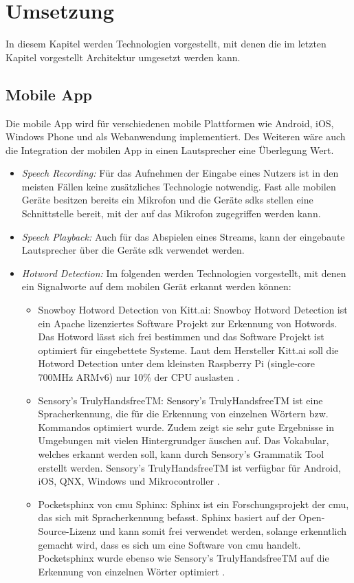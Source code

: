 \section{Umsetzung}
In diesem Kapitel werden Technologien vorgestellt, mit denen die im letzten Kapitel vorgestellt Architektur umgesetzt werden kann. 

\subsection{Mobile App}
Die mobile App wird für verschiedenen mobile Plattformen wie Android, iOS, Windows Phone und als Webanwendung implementiert. Des Weiteren wäre auch die Integration der mobilen App in einen Lautsprecher eine Überlegung Wert. 
\begin{itemize}
	\item \textsl{Speech Recording:} Für das Aufnehmen der Eingabe eines Nutzers ist in den meisten Fällen keine zusätzliches Technologie notwendig. Fast alle mobilen Geräte besitzen bereits ein Mikrofon und die Geräte \ac{sdk}s stellen eine Schnittstelle bereit, mit der auf das Mikrofon zugegriffen werden kann.
	\item \textsl{Speech Playback:} Auch für das Abspielen eines Streams, kann der eingebaute Lautsprecher über die Geräte \ac{sdk} verwendet werden.
	\item \textsl{Hotword Detection:} Im folgenden werden Technologien vorgestellt, mit denen ein Signalworte auf dem mobilen Gerät erkannt werden können: 
	\begin{itemize}
		\item Snowboy Hotword Detection von Kitt.ai: Snowboy Hotword Detection ist ein Apache lizenziertes Software Projekt zur Erkennung von Hotwords. Das Hotword lässt sich frei bestimmen und das Software Projekt ist optimiert für eingebettete Systeme. Laut dem Hersteller Kitt.ai soll die Hotword Detection unter dem kleinsten Raspberry Pi (single-core 700MHz ARMv6) nur 10\% der CPU
		auslasten \cite{SnowboyHotwordDetection}.
		\item Sensory's TrulyHandsfreeTM: Sensory's TrulyHandsfreeTM ist eine Spracherkennung, die für die Erkennung von einzelnen Wörtern bzw. Kommandos optimiert wurde. Zudem zeigt sie sehr gute Ergebnisse in Umgebungen mit vielen Hintergrundger	äuschen auf. Das Vokabular, welches erkannt werden soll, kann durch Sensory's Grammatik Tool erstellt werden. Sensory's TrulyHandsfreeTM ist verfügbar für Android, iOS, QNX, Windows und Mikrocontroller \cite{TrulyHandsfreeTM}.
		\item Pocketsphinx von \acs{cmu} Sphinx: Sphinx ist ein Forschungsprojekt der \ac{cmu}, das sich mit Spracherkennung befasst. Sphinx basiert auf der Open-Source-Lizenz und kann somit frei verwendet werden, solange erkenntlich gemacht wird, dass es sich um eine Software von \ac{cmu} handelt. Pocketsphinx wurde ebenso wie Sensory's TrulyHandsfreeTM auf die Erkennung von einzelnen Wörter optimiert \cite{Pocketsphinx}.
	\end{itemize}
\end{itemize}

